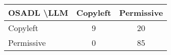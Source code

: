 \begin{tabular}{l|cc}\hline
	\textbf{OSADL \textbackslash LLM} & Copyleft & Permissive\\\hline
	Copyleft & 9 & 20\\
	Permissive & 0 & 85\\\hline
\end{tabular}
